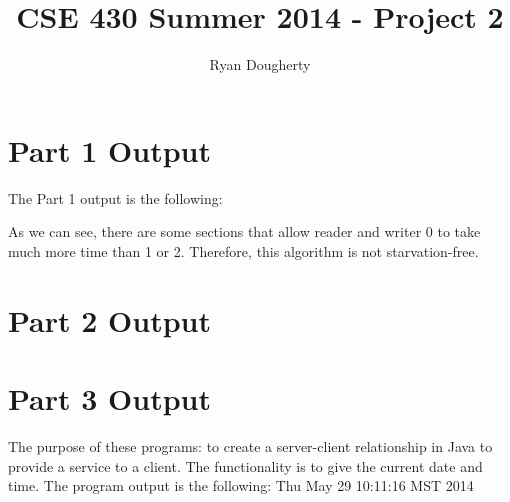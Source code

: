 \documentclass[12pt]{article}
\title{CSE 430 Summer 2014 - Project 2}
\author{Ryan Dougherty}
\date{}                                           %
\begin{document}
\maketitle


\section{Part 1 Output}
The Part 1 output is the following:
{\color{blue}

}
As we can see, there are some sections that allow reader and writer 0 to take much more time than 1 or 2. Therefore, this algorithm is not starvation-free. 

\section{Part 2 Output}

\section{Part 3 Output}
The purpose of these programs: to create a server-client relationship in Java to provide a service to a client. The functionality is to give the current date and time. The program output is the following:
{\color{blue}
\newline Thu May 29 10:11:16 MST 2014
}
\end{document}
